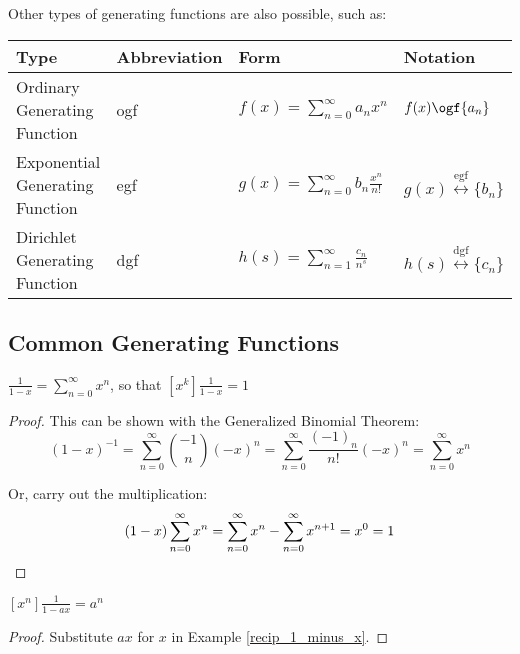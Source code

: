 \documentclass[a4paper]{article}
\begin{document}
\begin{definition}
Other types of generating functions are also possible, such as:
\begin{table}[H]
\centering
\begin{NiceTabular}{llll}\toprule
Type&Abbreviation&Form&Notation\\\midrule
Ordinary Generating Function&ogf&$f(x)=\sum_{n=0}^\infty a_nx^n$&$f(x)\ogf \{a_n\}$\\
Exponential Generating Function&egf&$g(x)=\sum_{n=0}^\infty b_n\frac{x^n}{n!}$&$g(x)\overset{\text{egf}}{\longleftrightarrow}\{b_n\}$\\
Dirichlet Generating Function&dgf&$h(s)=\sum_{n=1}^\infty\frac{c_n}{n^s}$&$h(s)\overset{\text{dgf}}{\longleftrightarrow}\{c_n\}$\\\bottomrule
\end{NiceTabular}
\end{table}
\end{definition}

\subsection{Common Generating Functions}

\begin{example}\label{recip_1_minus_x}
$\displaystyle\frac1{1-x}=\sum_{n=0}^\infty x^n$, so that $\displaystyle[x^k]\frac1{1-x}=1$

\begin{hl}
\begin{proof}
This can be shown with the Generalized Binomial Theorem:
\begin{equation*}
(1-x)^{-1}=\sum_{n=0}^\infty\binom{-1}n(-x)^n=\sum_{n=0}^\infty\frac{(-1)_n}{n!}(-x)^n=\sum_{n=0}^\infty x^n
\end{equation*}

Or, carry out the multiplication:
\begin{equation*}
(1-x)\sum_{n=0}^\infty x^n=\sum_{n=0}^\infty x^n-\sum_{n=0}^\infty x^{n+1}=x^0=1\qedhere
\end{equation*}
\end{proof}
\end{hl}
\end{example}

\begin{lemma}\label{generating_func_recip_linear}
$\displaystyle[x^n]\frac1{1-ax}=a^n$

\begin{hl}
\begin{proof}
Substitute $ax$ for $x$ in Example \ref{recip_1_minus_x}.
\end{proof}
\end{hl}
\end{lemma}
\end{document}

